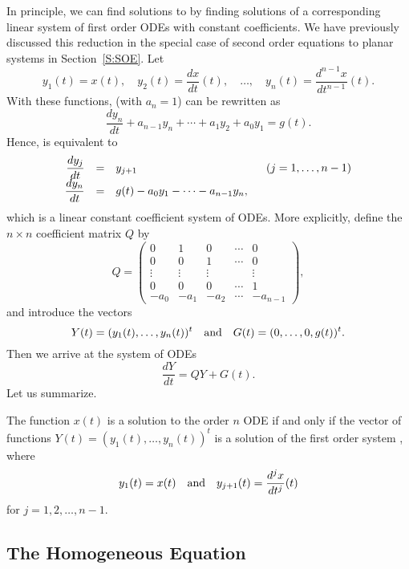 \documentclass{ximera}
\begin{document}
In principle, we can find solutions to  by finding 
solutions of a corresponding 
linear system of first order 
ODEs with 
constant coefficients.  We have previously discussed this reduction in
the special case of second order equations to planar systems in 
Section~\ref{S:SOE}.  Let
\begin{equation}   \label{eq:trick}
y_1(t)=x(t),\quad y_2(t)=\frac{dx}{dt}(t),\quad
\ldots, \quad  y_n(t)=\frac{d^{n-1}x}{dt^{n-1}}(t).
\end{equation}
With these functions,  (with $a_n=1$) can be rewritten as
\[
\frac{dy_n}{dt} + a_{n-1} y_n + \cdots + a_1 y_2 + a_0 y_1 = g(t).
\]
Hence,  is equivalent to
\arraystart
\[
\begin{array}{rcl}
\displaystyle \frac{dy_j}{dt}&=&y_{j+1} \hspace{1.6in} (j=1,\ldots,n-1)\\
\displaystyle \frac{dy_n}{dt}&=& g(t) - a_0y_1 - \cdots - a_{n-1} y_n,
\end{array}
\]
\arrayfinish
which is a linear constant coefficient system of ODEs.  More explicitly,
define the $n\times n$ coefficient matrix $Q$ by 
\begin{equation}   \label{eq:coefma}
Q = \left(\begin{array}{ccccc}
0 & 1 & 0 & \cdots & 0\\
0 & 0 & 1 & \cdots & 0\\
\vdots & \vdots & \vdots & & \vdots\\
0 & 0 & 0 & \cdots & 1\\
-a_0 & -a_1 &  -a_2 & \cdots & -a_{n-1}
\end{array}\right),
\end{equation}
and introduce the vectors 
\[
Y(t) = (y_1(t),\ldots,y_n(t))^t  \quad\mbox{and}\quad
G(t) = (0,\ldots,0,g(t))^t.  
\]
Then we arrive at the system of ODEs
\begin{equation}  \label{eq:highrw}
\frac{dY}{dt} = QY+G(t).
\end{equation}
Let us summarize.
\begin{prop}   \label{prop:ho1}
The function $x(t)$ is a solution to the order $n$ ODE   
if and only if the vector of functions $Y(t)=(y_1(t),\ldots,y_n(t))^t$ is 
a solution of the first order system , where 
\[
y_1(t) = x(t) \quad\mbox{and}\quad y_{j+1}(t)=\displaystyle \frac{d^jx}{dt^j}(t) 
\]
for $j=1,2,\ldots,n-1$.
\end{prop}

\subsection*{The Homogeneous Equation}
\end{document}
